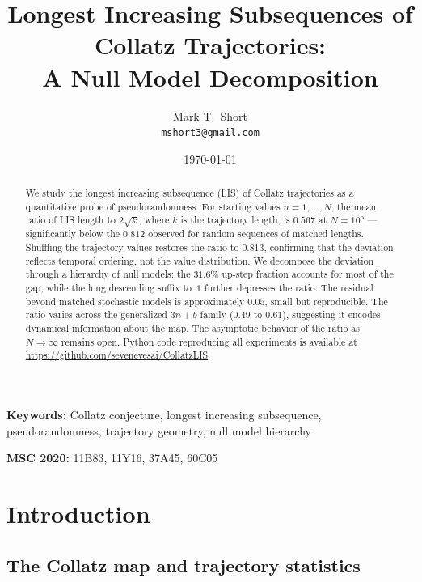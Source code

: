 \documentclass[11pt]{article}
\theoremstyle{definition}
\theoremstyle{remark}
\begin{document}
\title{Longest Increasing Subsequences of Collatz Trajectories:\\
  A Null Model Decomposition}

\author{Mark T.\ Short\\
  \texttt{mshort3@gmail.com}}

\date{\today}

\maketitle

\begin{abstract}
We study the longest increasing subsequence (LIS) of Collatz trajectories
as a quantitative probe of pseudorandomness. For starting values
$n = 1, \ldots, N$, the mean ratio of LIS length to $2\sqrt{k}$, where
$k$ is the trajectory length, is $0.567$ at $N = 10^6$ ---
significantly below the $0.812$ observed for random sequences of
matched lengths. Shuffling the trajectory values restores the ratio to
$0.813$, confirming that the deviation reflects temporal ordering, not the
value distribution. We decompose the deviation through a hierarchy of null
models: the $31.6\%$ up-step fraction accounts for most of the gap, while
the long descending suffix to~$1$ further depresses the ratio. The
residual beyond matched stochastic models is approximately $0.05$, small
but reproducible. The ratio varies across the generalized $3n+b$ family
($0.49$ to $0.61$), suggesting it encodes dynamical information about the
map. The asymptotic behavior of the ratio as $N \to \infty$ remains open.
Python code reproducing all experiments is available at
\url{https://github.com/sevenevesai/CollatzLIS}.
\end{abstract}

\noindent\textbf{Keywords:} Collatz conjecture, longest increasing
subsequence, pseudorandomness, trajectory geometry, null model hierarchy

\noindent\textbf{MSC 2020:} 11B83, 11Y16, 37A45, 60C05

\section{Introduction}\label{sec:intro}

\subsection{The Collatz map and trajectory statistics}
\end{document}
